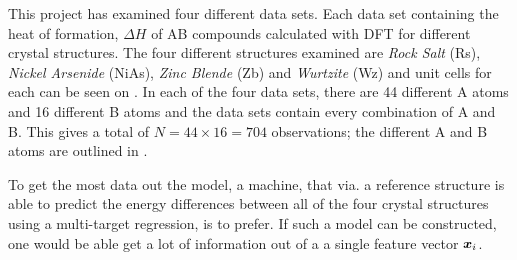 This project has examined four different data sets. Each data set containing the heat of formation, $\Delta H$ of AB compounds calculated with DFT for different crystal structures. The four different structures examined are \emph{Rock Salt} (Rs), \emph{Nickel Arsenide} (NiAs), \emph{Zinc Blende} (Zb) and \emph{Wurtzite} (Wz) and unit cells for each can be seen on . In each of the four data sets, there are 44 different A atoms and 16 different B atoms and the data sets contain every combination of A and B. This gives a total of $N = 44 \times 16 = 704$ observations; the different A and B atoms are outlined in .

To get the most data out the model, a machine, that via. a reference structure is able to predict the energy differences between all of the four crystal structures using a multi-target regression, is to prefer. If such a model can be constructed, one would be able get a lot of information out of a a single feature vector $\bm{x}_i$. 

